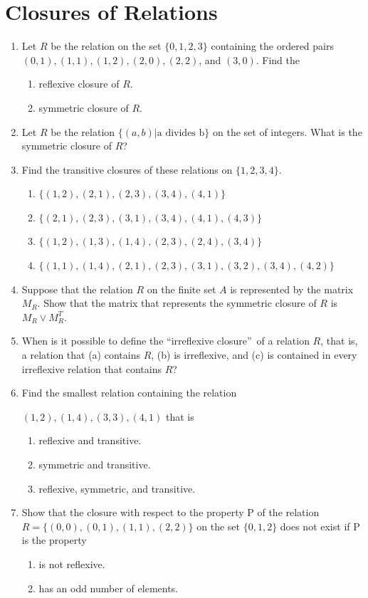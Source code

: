 \documentclass{../../cls/sig-alternate-05-2015}
\begin{document}
\section{Closures of Relations}
\begin{enumerate}
\item Let $R$ be the relation on the set $\{0, 1, 2, 3\}$ containing the ordered pairs $(0, 1), (1, 1), (1, 2), (2, 0), (2, 2)$, and $(3, 0)$. Find the
	\begin{enumerate}
		\item reflexive closure of $R$.
		\item symmetric closure of $R$.
	\end{enumerate}

\item Let $R$ be the relation $\{(a, b) | \text{a divides b}\}$ on the set of
integers. What is the symmetric closure of $R$?
	
\item Find the transitive closures of these relations on $\{1, 2, 3, 4\}$.
	\begin{enumerate}
		\item $\{(1, 2), (2,1), (2,3), (3,4), (4,1)\}$
		\item $\{(2, 1), (2,3), (3,1), (3,4), (4,1), (4, 3)\}$
		\item $\{(1, 2), (1,3), (1,4), (2,3), (2,4), (3, 4)\}$
		\item $\{(1, 1), (1,4), (2,1), (2,3), (3,1), (3, 2), (3,4), (4, 2)\}$
	\end{enumerate}
	
\item Suppose that the relation $R$ on the finite set $A$ is represented by the matrix $M_R$. Show that the matrix that represents the symmetric closure of $R$ is $M_R \vee M^T_R$.

\item When is it possible to define the \textquotedblleft irreflexive closure\textquotedblright\ of a relation $R$, that is, a relation that (a) contains $R$, (b) is irreflexive,
and (c) is contained in every irreflexive relation
that contains $R$?
	
\item Find the smallest relation containing the relation
	
	${(1, 2), (1, 4), (3, 3), (4, 1)}$ that is
	\begin{enumerate}
		\item reflexive and transitive.
		\item symmetric and transitive.
		\item reflexive, symmetric, and transitive.
	\end{enumerate}
	
\item Show that the closure with respect to the property P of
the relation $R = \{(0, 0), (0, 1), (1, 1), (2, 2)\}$ on the set
$\{0, 1, 2\}$ does not exist if P is the property
	\begin{enumerate}
		\item is not reflexive.
		\item has an odd number of elements.
	\end{enumerate}
\end{enumerate}
\end{document}

